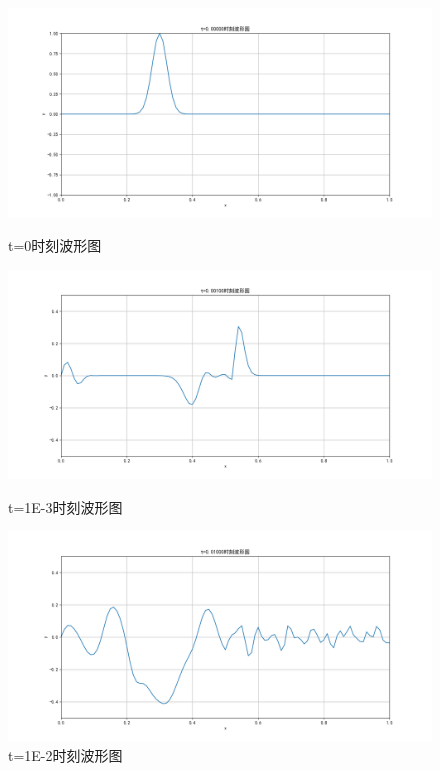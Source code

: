\documentclass[11pt]{ctexart}
\begin{document}
\begin{figure}[ht]
\centering
\includegraphics[width=0.8\linewidth]{Pyfingure/Figure_3_3.png} 
\caption{t=0时刻波形图}
\includegraphics[width=0.8\linewidth]{Pyfingure/Figure_3_1.png} 
\caption{t=1E-3时刻波形图}
\includegraphics[width=0.8\linewidth]{Pyfingure/Figure_3_2.png} 
\caption{t=1E-2时刻波形图}
\end{figure}
\end{document}
